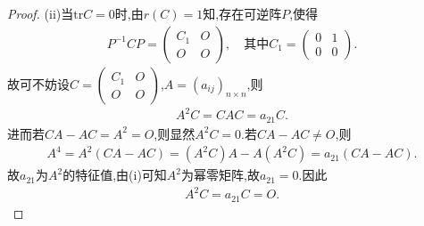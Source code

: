 \documentclass[../../main.tex]{subfiles}%
\begin{document}
\begin{proof}
(ii)当$\mathrm{tr}C=0$时,由$r(C)=1$知,存在可逆阵$P$,使得
\begin{align*}
P^{-1}CP=\begin{pmatrix}
C_1&O\\
O&O
\end{pmatrix},\quad 其中C_1=\begin{pmatrix}
0&1\\
0&0
\end{pmatrix}.
\end{align*}
故可不妨设$C=\begin{pmatrix}
C_1&O\\
O&O
\end{pmatrix}$,$A=(a_{ij})_{n\times n}$,则
\begin{align*}
A^2C=CAC=a_{21}C.
\end{align*}
进而若$CA-AC=A^2=O$,则显然$A^2C=0$.若$CA-AC\ne O$,则
\begin{align*}
A^4=A^2(CA-AC)=(A^2C)A-A(A^2C)=a_{21}(CA-AC).
\end{align*}
故$a_{21}$为$A^2$的特征值,由(i)可知$A^2$为幂零矩阵,故$a_{21}=0$.因此
\begin{align*}
A^2C=a_{21}C=O.
\end{align*}

\end{proof}
\end{document}
